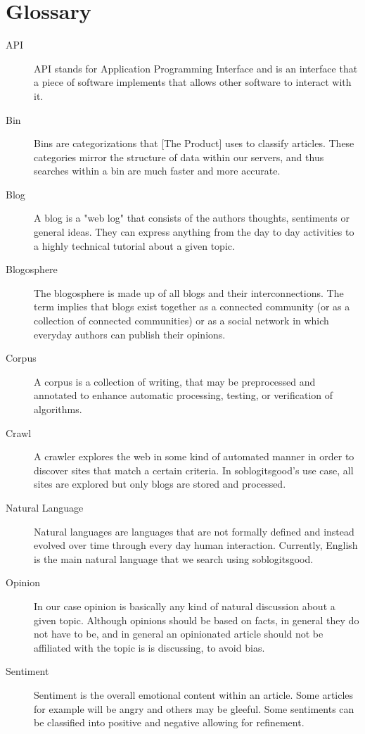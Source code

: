 \documentclass[titlepage]{article}
\begin{document}
\section{Glossary}
\begin{description}
\item[API]
API stands for Application Programming Interface and is an interface that a
piece of software implements that allows other software to interact with it.
\item[Bin] 
Bins are categorizations that [The Product] uses to classify articles. These 
categories mirror the structure of data within our servers, and thus searches 
within a bin are much faster and more accurate.
\item[Blog] 
A blog is a "web log" that consists of the authors thoughts, sentiments or
general ideas. They can express anything from the day to day activities to a 
highly technical tutorial about a given topic.
\item[Blogosphere] 
The blogosphere is made up of all blogs and their interconnections. The term
implies that blogs exist together as a connected community (or as a collection
of connected communities) or as a social network in which everyday authors can
publish their opinions.
\item[Corpus] 
A corpus is a collection of writing, that may be preprocessed and annotated to
enhance automatic processing, testing, or verification of algorithms.
\item[Crawl] 
A crawler explores the web in some kind of automated manner in order to discover
sites that match a certain criteria. In \textsf{soblogitsgood}'s use case, all sites are 
explored but only blogs are stored and processed.
\item[Natural Language] 
Natural languages are languages that are not formally defined and instead 
evolved over time through every day human interaction. Currently, English is
the main natural language that we search using \textsf{soblogitsgood}.
\item[Opinion] 
In our case opinion is basically any kind of natural discussion about a given
topic. Although opinions should be based on facts, in general they do not have
to be, and in general an opinionated article should not be affiliated with the
topic is is discussing, to avoid bias.
\item[Sentiment] 
Sentiment is the overall emotional content within an article. Some articles for example will be angry and others may be gleeful. Some sentiments can be 
classified into positive and negative allowing for refinement.
\end{description}
\end{document}

